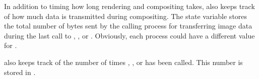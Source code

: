 In addition to timing how long rendering and compositing takes, \IceT also
keeps track of how much data is transmitted during compositing.  The state
variable  stores the total number of bytes sent by
the calling process for transferring image data during the last call to
, , or
.  Obviously, each process could have a different
value for .

\IceT also keeps track of the number of times ,
, or  has been called.
This number is stored in .

